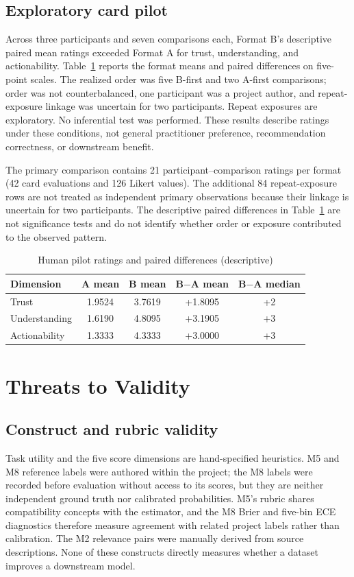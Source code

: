 \documentclass[conference]{IEEEtran}
\begin{document}
\subsection{Exploratory card pilot}
Across three participants and seven comparisons each, Format B's descriptive paired mean ratings exceeded Format A for trust, understanding, and actionability. Table~\ref{tab:pilot} reports the format means and paired differences on five-point scales. The realized order was five B-first and two A-first comparisons; order was not counterbalanced, one participant was a project author, and repeat-exposure linkage was uncertain for two participants. Repeat exposures are exploratory. No inferential test was performed. These results describe ratings under these conditions, not general practitioner preference, recommendation correctness, or downstream benefit.

The primary comparison contains 21 participant--comparison ratings per format (42 card evaluations and 126 Likert values). The additional 84 repeat-exposure rows are not treated as independent primary observations because their linkage is uncertain for two participants. The descriptive paired differences in Table~\ref{tab:pilot} are not significance tests and do not identify whether order or exposure contributed to the observed pattern.

\begin{table}[H]
\caption{Human pilot ratings and paired differences (descriptive)}
\label{tab:pilot}
\centering
\footnotesize
\begin{tabular}{lcccc}
\toprule
Dimension & A mean & B mean & B$-$A mean & B$-$A median\\
\midrule
Trust & 1.9524 & 3.7619 & +1.8095 & +2\\
Understanding & 1.6190 & 4.8095 & +3.1905 & +3\\
Actionability & 1.3333 & 4.3333 & +3.0000 & +3\\
\bottomrule
\end{tabular}
\end{table}

\section{Threats to Validity}
\subsection{Construct and rubric validity}
Task utility and the five score dimensions are hand-specified heuristics. M5 and M8 reference labels were authored within the project; the M8 labels were recorded before evaluation without access to its scores, but they are neither independent ground truth nor calibrated probabilities. M5's rubric shares compatibility concepts with the estimator, and the M8 Brier and five-bin ECE diagnostics therefore measure agreement with related project labels rather than calibration. The M2 relevance pairs were manually derived from source descriptions. None of these constructs directly measures whether a dataset improves a downstream model.
\end{document}
